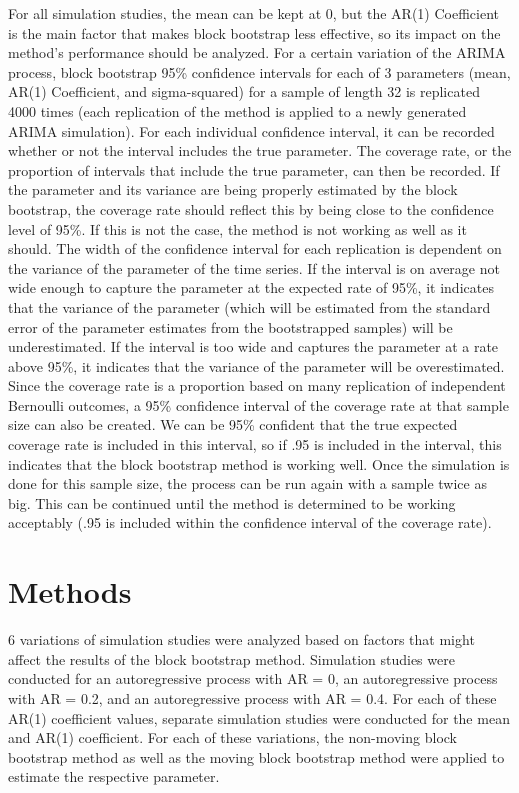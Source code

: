 \documentclass[12pt, letterpaper, titlepage]{article}
\begin{document}
For all simulation studies, the mean can be kept at 0, but the AR(1) Coefficient is the main factor that makes block bootstrap less effective, so its impact on the method's performance should be analyzed. For a certain variation of the ARIMA process, block bootstrap 95\% confidence intervals for each of 3 parameters (mean, AR(1) Coefficient, and sigma-squared) for a sample of length 32 is replicated 4000 times (each replication of the method is applied to a newly generated ARIMA simulation). For each individual confidence interval, it can be recorded whether or not the interval includes the true parameter. The coverage rate, or the proportion of intervals that include the true parameter, can then be recorded. If the parameter and its variance are being properly estimated by the block bootstrap, the coverage rate should reflect this by being close to the confidence level of 95\%. If this is not the case, the method is not working as well as it should. The width of the confidence interval for each replication is dependent on the variance of the parameter of the time series. If the interval is on average not wide enough to capture the parameter at the expected rate of 95\%, it indicates that the variance of the parameter (which will be estimated from the standard error of the parameter estimates from the bootstrapped samples) will be underestimated. If the interval is too wide and captures the parameter at a rate above 95\%, it indicates that the variance of the parameter will be overestimated. Since the coverage rate is a proportion based on many replication of independent Bernoulli outcomes, a 95\% confidence interval of the coverage rate at that sample size can also be created. We can be 95\% confident that the true expected coverage rate is included in this interval, so if .95 is included in the interval, this indicates that the block bootstrap method is working well. Once the simulation is done for this sample size, the process can be run again with a sample twice as big. This can be continued until the method is determined to be working acceptably (.95 is included within the confidence interval of the coverage rate).

\section{Methods}
\label{sec:methods}

6 variations of simulation studies were analyzed based on factors that might affect the results of the block bootstrap method. Simulation studies were conducted for an autoregressive process with AR = 0, an autoregressive process with AR = 0.2, and an autoregressive process with AR = 0.4. For each of these AR(1) coefficient values, separate simulation studies were conducted for the mean and AR(1) coefficient. For each of these variations, the non-moving block bootstrap method as well as the moving block bootstrap method were applied to estimate the respective parameter. 
\end{document}
